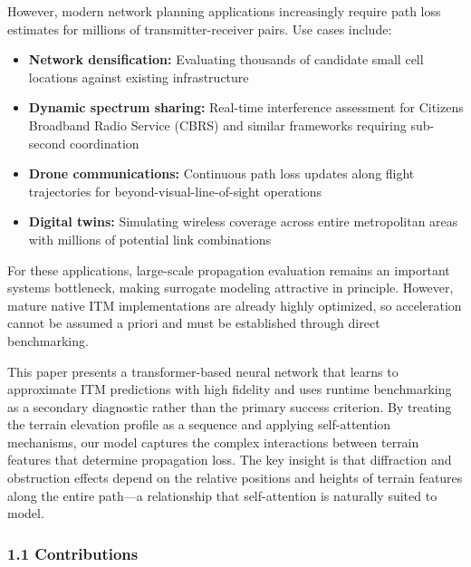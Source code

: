 \documentclass[
]{article}
\providecommand{\tightlist}{%
  \setlength{\itemsep}{0pt}\setlength{\parskip}{0pt}}
\begin{document}
However, modern network planning applications increasingly require path
loss estimates for millions of transmitter-receiver pairs. Use cases
include:

\begin{itemize}
\tightlist
\item
  \textbf{Network densification:} Evaluating thousands of candidate
  small cell locations against existing infrastructure
\item
  \textbf{Dynamic spectrum sharing:} Real-time interference assessment
  for Citizens Broadband Radio Service (CBRS) and similar frameworks
  requiring sub-second coordination
\item
  \textbf{Drone communications:} Continuous path loss updates along
  flight trajectories for beyond-visual-line-of-sight operations
\item
  \textbf{Digital twins:} Simulating wireless coverage across entire
  metropolitan areas with millions of potential link combinations
\end{itemize}

For these applications, large-scale propagation evaluation remains an
important systems bottleneck, making surrogate modeling attractive in
principle. However, mature native ITM implementations are already highly
optimized, so acceleration cannot be assumed a priori and must be
established through direct benchmarking.

This paper presents a transformer-based neural network that learns to
approximate ITM predictions with high fidelity and uses runtime
benchmarking as a secondary diagnostic rather than the primary success
criterion. By treating the terrain elevation profile as a sequence and
applying self-attention mechanisms, our model captures the complex
interactions between terrain features that determine propagation loss.
The key insight is that diffraction and obstruction effects depend on
the relative positions and heights of terrain features along the entire
path---a relationship that self-attention is naturally suited to model.

\subsubsection{1.1 Contributions}\label{contributions}
\end{document}
